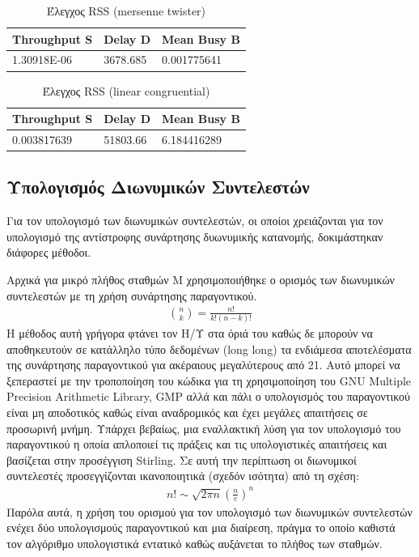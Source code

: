 \documentclass[12pt]{report}
\begin{document}
\begin{table}[h!]
\centering
\scriptsize
\begin{tabular}{||p{2cm}|p{2cm}|p{2cm}||}
\hline
\textlatin{Throughput S} & \textlatin{Delay D} & \textlatin{Mean Busy B} \\ [0.5ex]
\hline\hline
1.30918E-06	& 3678.685 & 0.001775641\\ [1ex] 
\hline
\end{tabular}
\caption{Έλεγχος \textlatin{RSS} (\textlatin{mersenne twister})}
\label{tab02}
\end{table}

\begin{table}[h!]
\centering
\scriptsize
\begin{tabular}{||p{2cm}|p{2cm}|p{2cm}||}
\hline
\textlatin{Throughput S} & \textlatin{Delay D} & \textlatin{Mean Busy B} \\ [0.5ex]
\hline\hline
0.003817639	& 51803.66 & 6.184416289\\ [1ex] 
\hline
\end{tabular}
\caption{Έλεγχος \textlatin{RSS} (\textlatin{linear congruential})}
\label{tab03}
\end{table}

\subsection{Υπολογισμός Διωνυμικών Συντελεστών}
Για τον υπολογισμό των διωνυμικών συντελεστών, οι οποίοι χρειάζονται για τον υπολογισμό της αντίστροφης συνάρτησης δυωνυμικής κατανομής, δοκιμάστηκαν διάφορες μέθοδοι.

Αρχικά για μικρό πλήθος σταθμών \textlatin{M} χρησιμοποιήθηκε ο ορισμός των διωνυμικών συντελεστών με τη χρήση συνάρτησης παραγοντικού.
\begin{align*}
  \binom{n}{k}=\frac {n!}{k!(n-k)!}
\end{align*}
Η μέθοδος αυτή γρήγορα φτάνει τον Η/Υ στα όριά του καθώς δε μπορούν να αποθηκευτούν σε κατάλληλο τύπο δεδομένων (\textlatin{long long}) τα ενδιάμεσα αποτελέσματα της συνάρτησης παραγοντικού για ακέραιους μεγαλύτερους από 21. Αυτό μπορεί να ξεπεραστεί με την τροποποίηση του κώδικα για τη χρησιμοποίηση του \textlatin{GNU Multiple Precision Arithmetic Library, GMP} αλλά και πάλι ο υπολογισμός του παραγοντικού είναι μη αποδοτικός καθώς είναι αναδρομικός και έχει μεγάλες απαιτήσεις σε προσωρινή μνήμη. Υπάρχει βεβαίως, μια εναλλακτική λύση για τον υπολογισμό του παραγοντικού η οποία απλοποιεί τις πράξεις και τις υπολογιστικές απαιτήσεις και βασίζεται στην προσέγγιση \textlatin{Stirling}. Σε αυτή την περίπτωση οι διωνυμικοί συντελεστές προσεγγίζονται ικανοποιητικά (σχεδόν ισότητα) από τη σχέση:
\begin{align*}
  n!\sim\sqrt{2\pi n}\left(\frac{n}{e}\right)^{n}
\end{align*}
Παρόλα αυτά, η χρήση του ορισμού για τον υπολογισμό των διωνυμικών συντελεστών ενέχει δύο υπολογισμούς παραγοντικού και μια διαίρεση, πράγμα το οποίο καθιστά τον αλγόριθμο υπολογιστικά εντατικό καθώς αυξάνεται το πλήθος των σταθμών.
\end{document}
